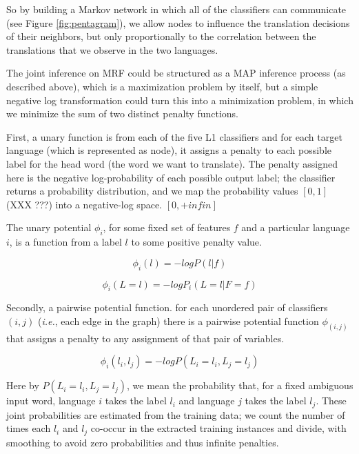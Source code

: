 \documentclass[11pt,letterpaper]{article}
\begin{document}
So by building a Markov network in which all of the classifiers can
communicate (see Figure \ref{fig:pentagram}), we allow nodes to influence the
translation decisions of their neighbors, but only proportionally to the
correlation between the translations that we observe in the two languages.


The joint inference on MRF could be structured as a MAP inference process (as described above),
which is a maximization problem by itself, but a simple negative log transformation could turn this into
a minimization problem, in which we minimize the sum of two distinct penalty functions.



First, a unary function is from each of the five L1 classifiers and for each target language (which is represented as node),
it assigns a penalty to each possible label for the head word (the word we want to translate).
The penalty assigned here is the negative log-probability of each possible output label; the classifier returns
a probability distribution, and we map the probability values $[0,1]$ (XXX ???)  into a negative-log space. $[0, +infin]$

The unary potential $\phi_i$, for some fixed set of features $f$ and a
particular language $i$, is a function from a label $l$ to some positive
penalty value.

$$
\phi_i(l) = - log P(l | f)
$$

$$
\phi_i(L=l) = - log P_{i}(L=l | F=f)
$$


Secondly, a pairwise potential function. for each unordered pair of classifiers $(i,j)$ (\emph{i.e.}, each
edge in the graph) there is a pairwise potential function $\phi_{(i,j)}$ that
assigns a penalty to any assignment of that pair of variables.

$$
\phi_i(l_i, l_j) = - log P(L_i = l_i, L_j = l_j)
$$

Here by $P(L_i = l_i, L_j = l_j)$, we mean the probability that, for a fixed
ambiguous input word, language $i$ takes the label $l_i$ and language $j$ takes
the label $l_j$. These joint probabilities are estimated from the training
data; we count the number of times each $l_i$ and $l_j$ co-occur in the
extracted training instances and divide, with smoothing to avoid zero
probabilities and thus infinite penalties.
\end{document}
